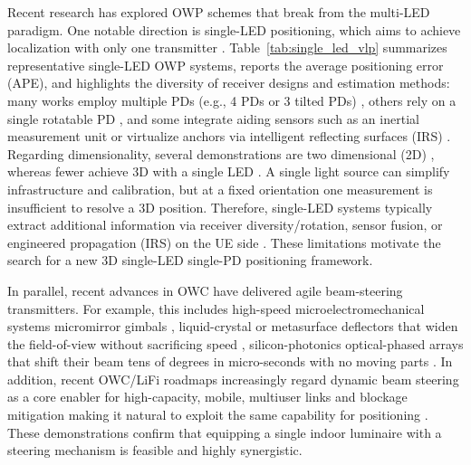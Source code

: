 \documentclass[journal]{IEEEtran}
\begin{document}
Recent research has explored OWP schemes that break from the multi-LED paradigm. One notable direction is single-LED positioning, which aims to achieve localization with only one transmitter \cite{Qin2020,Chen2021,Qin2021,Liu2022,Zia-Ul-Mustafa2023,Chassagne2025,Zhang2024,Li2024,Wang2024,Ma2024,Shi2025,ShiJin2025}. 
Table~\ref{tab:single_led_vlp} summarizes representative single-LED OWP systems, reports the average positioning error (APE), and highlights the diversity of receiver designs and estimation methods: many works employ multiple PDs (e.g., 4 PDs or 3 tilted PDs) \cite{Qin2020,Qin2021,Zia-Ul-Mustafa2023,Zhang2024,Li2024}, others rely on a single rotatable PD \cite{Liu2022,Wang2024,Shi2025}, and some integrate aiding sensors such as an inertial measurement unit \cite{Ma2024} or virtualize anchors via intelligent reflecting surfaces (IRS) \cite{ShiJin2025}. 
Regarding dimensionality, several demonstrations are two dimensional (2D) \cite{Chen2021,Qin2021,Liu2022,Zia-Ul-Mustafa2023,Chassagne2025,Zhang2024,Wang2024,Shi2025,ShiJin2025}, whereas fewer achieve 3D with a single LED \cite{Qin2020,Li2024,Ma2024}. 
A single light source can simplify infrastructure and calibration, but at a fixed orientation one measurement is insufficient to resolve a 3D position. Therefore, single-LED systems typically extract additional information via receiver diversity/rotation, sensor fusion, or engineered propagation (IRS) on the UE side \cite{Qin2020,Chen2021,Liu2022,Wang2024,Ma2024,ShiJin2025}. 
These limitations motivate the search for a new 3D single-LED single-PD positioning framework.

In parallel, recent advances in OWC have delivered agile beam-steering transmitters. For example, this includes high-speed microelectromechanical systems micromirror gimbals \cite{Liu:25}, liquid-crystal or metasurface deflectors that widen the field-of-view without sacrificing speed \cite{Feng2019}, silicon-photonics optical-phased arrays that shift their beam tens of degrees in micro-seconds with no moving parts \cite{mi13070990}.
In addition, recent OWC/LiFi roadmaps increasingly regard dynamic beam steering as a core enabler for high-capacity, mobile, multiuser links and blockage mitigation making it natural to exploit the same capability for positioning \cite{mi13070990,Zeng2023,Jin2023}.
These demonstrations confirm that equipping a single indoor luminaire with a steering mechanism is feasible and highly synergistic.
\end{document}
